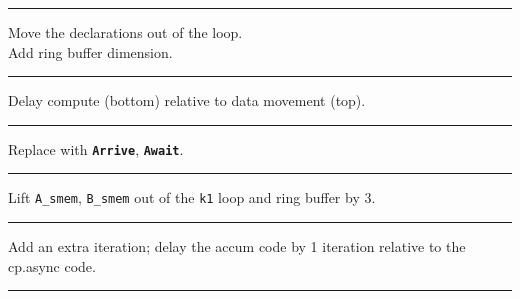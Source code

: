 \newpage
{}

{\large

}

\vspace{3mm}
\hrule
\vspace{-2mm}

{\LARGE
Move the  declarations out of the  loop.\\
Add ring buffer dimension.
}

\newpage
{}

{\large

}

\vspace{3mm}
\hrule

{\LARGE
Delay compute (bottom) relative to data movement (top).
}

\newpage
{}

{\large

}

\vspace{3mm}
\hrule

{\LARGE
Replace with \textbf{\texttt{Arrive}}, \textbf{\texttt{Await}}.
}

\newpage
{}

{\large

}

\vspace{3mm}
\hrule

{\LARGE

Lift \texttt{A\_smem}, \texttt{B\_smem} out of the \texttt{k1} loop and ring buffer by 3.

}

\newpage
{}

{\large

}

\vspace{3mm}
\hrule

{\LARGE

Add an extra  iteration; delay the accum code by 1 iteration relative to the cp.async code.

}

\newpage
{}

{\large

}

\vspace{3mm}
\hrule

